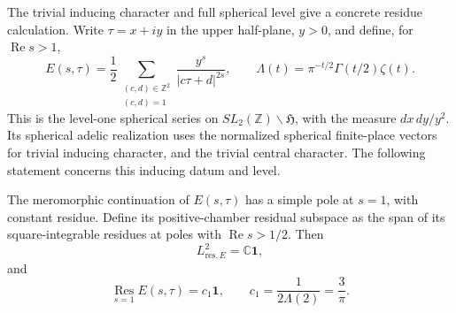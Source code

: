 The trivial inducing character and full spherical level give a concrete
residue calculation. Write $\tau=x+iy$ in the upper half-plane,
$y>0$, and define, for $\operatorname{Re}s>1$,
\[
 E(s,\tau)=\frac12\sum_{\substack{(c,d)\in\mathbb Z^2\\(c,d)=1}}
       \frac{y^s}{|c\tau+d|^{2s}},\qquad
 \Lambda(t)=\pi^{-t/2}\Gamma(t/2)\zeta(t).
\]
This is the level-one spherical series on
$SL_2(\mathbb Z)\backslash\mathfrak H$, with the measure $dx\,dy/y^2$.
Its spherical adelic realization uses the normalized spherical finite-place vectors
for trivial inducing character, and the trivial central character. The following statement concerns
this inducing datum and level.

\begin{proposition}
\label{v4-arith:w10-d:prop:residual-s1}
The meromorphic continuation of $E(s,\tau)$ has a simple pole at $s=1$,
with constant residue. Define its positive-chamber residual subspace
as the span of its square-integrable residues at poles with
$\operatorname{Re}s>1/2$. Then
\begin{equation}\label{v4-arith:w10-d:eq:residual-s1}
 L^2_{\mathrm{res},E}=\mathbb C\mathbf1,
\end{equation}
and
\begin{equation}\label{v4-arith:w10-d:eq:residue-E}
 \operatorname*{Res}_{s=1}E(s,\tau)=c_1\mathbf1,
 \qquad c_1=\frac1{2\Lambda(2)}=\frac3\pi.
\end{equation}
\end{proposition}
